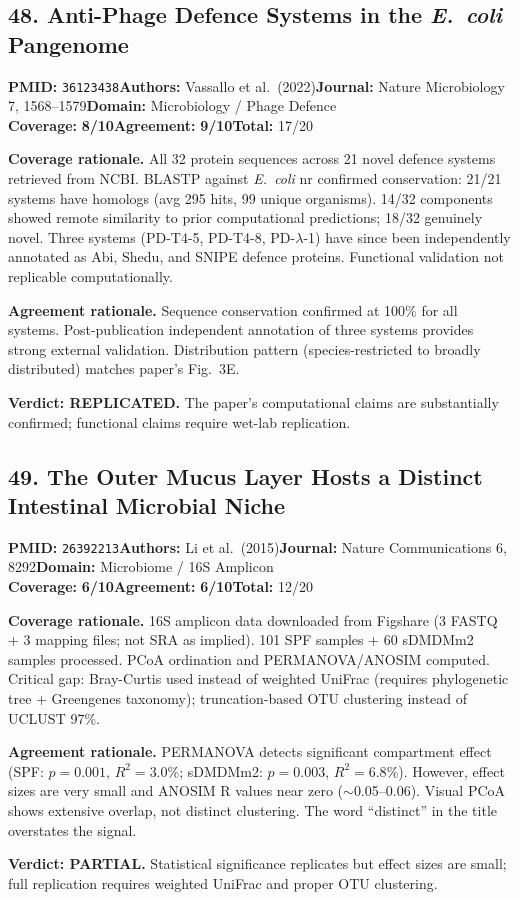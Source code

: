 \documentclass[11pt]{article}
\newcommand{\scorebadge}[2]{\textbf{#1:} \textbf{#2/10}}
\begin{document}
\subsection{48. Anti-Phage Defence Systems in the \textit{E.\ coli} Pangenome}
\textbf{PMID:} \texttt{36123438}\quad\textbf{Authors:} Vassallo et al.\ (2022)\quad\textbf{Journal:} Nature Microbiology 7, 1568--1579\quad\textbf{Domain:} Microbiology / Phage Defence\\
\scorebadge{Coverage}{8}\quad\scorebadge{Agreement}{9}\quad\textbf{Total:} 17/20\par\smallskip
\noindent\textbf{Coverage rationale.} All 32 protein sequences across 21 novel defence systems retrieved from NCBI. BLASTP against \textit{E.~coli} nr confirmed conservation: 21/21 systems have homologs (avg 295 hits, 99 unique organisms). 14/32 components showed remote similarity to prior computational predictions; 18/32 genuinely novel. Three systems (PD-T4-5, PD-T4-8, PD-$\lambda$-1) have since been independently annotated as Abi, Shedu, and SNIPE defence proteins. Functional validation not replicable computationally.\par
\noindent\textbf{Agreement rationale.} Sequence conservation confirmed at 100\% for all systems. Post-publication independent annotation of three systems provides strong external validation. Distribution pattern (species-restricted to broadly distributed) matches paper's Fig.~3E.\par\smallskip
\noindent\textbf{Verdict: REPLICATED.} The paper's computational claims are substantially confirmed; functional claims require wet-lab replication.

\subsection{49. The Outer Mucus Layer Hosts a Distinct Intestinal Microbial Niche}
\textbf{PMID:} \texttt{26392213}\quad\textbf{Authors:} Li et al.\ (2015)\quad\textbf{Journal:} Nature Communications 6, 8292\quad\textbf{Domain:} Microbiome / 16S Amplicon\\
\scorebadge{Coverage}{6}\quad\scorebadge{Agreement}{6}\quad\textbf{Total:} 12/20\par\smallskip
\noindent\textbf{Coverage rationale.} 16S amplicon data downloaded from Figshare (3 FASTQ + 3 mapping files; not SRA as implied). 101 SPF samples + 60 sDMDMm2 samples processed. PCoA ordination and PERMANOVA/ANOSIM computed. Critical gap: Bray-Curtis used instead of weighted UniFrac (requires phylogenetic tree + Greengenes taxonomy); truncation-based OTU clustering instead of UCLUST 97\%.\par
\noindent\textbf{Agreement rationale.} PERMANOVA detects significant compartment effect (SPF: $p=0.001$, $R^2=3.0\%$; sDMDMm2: $p=0.003$, $R^2=6.8\%$). However, effect sizes are very small and ANOSIM R values near zero ($\sim$0.05--0.06). Visual PCoA shows extensive overlap, not distinct clustering. The word ``distinct'' in the title overstates the signal.\par\smallskip
\noindent\textbf{Verdict: PARTIAL.} Statistical significance replicates but effect sizes are small; full replication requires weighted UniFrac and proper OTU clustering.
\end{document}
